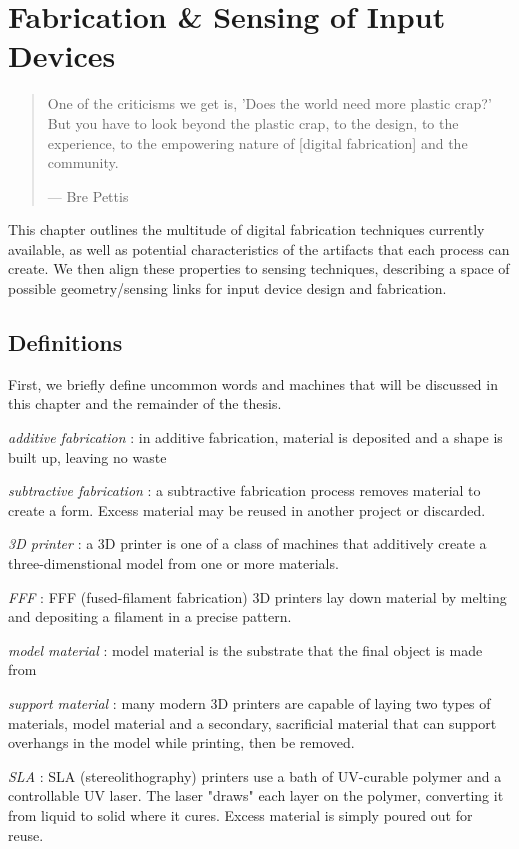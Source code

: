 \chapter{Fabrication \& Sensing of Input Devices}


\begin{quote}
One of the criticisms we get is, 'Does the world need more plastic crap?' But you have to look beyond the plastic crap, to the design, to the experience, to the empowering nature of [digital fabrication] and the community.

--- Bre Pettis
\end{quote}

This chapter outlines the multitude of digital fabrication techniques currently available, as well as potential characteristics of the artifacts that each process can create. We then align these properties to sensing techniques, describing a space of possible geometry/sensing links for input device design and fabrication.

\section{Definitions}

First, we briefly define uncommon words and machines that will be discussed in this chapter and the remainder of the thesis.

\emph{additive fabrication} : in additive fabrication, material is deposited and a shape is built up, leaving no waste

\emph{subtractive fabrication} : a subtractive fabrication process removes material to create a form. Excess material may be reused in another project or discarded.

\emph{3D printer} : a 3D printer is one of a class of machines that additively create a three-dimenstional model from one or more materials.

\emph{FFF} : FFF (fused-filament fabrication) 3D printers lay down material by melting and depositing a filament in a precise pattern.

\emph{model material} : model material is the substrate that the final object is made from

\emph{support material} : many modern 3D printers are capable of laying two types of materials, model material and a secondary, sacrificial material that can support overhangs in the model while printing, then be removed.

\emph{SLA} : SLA (stereolithography) printers use a bath of UV-curable polymer and a controllable UV laser. The laser "draws" each layer on the polymer, converting it from liquid to solid where it cures. Excess material is simply poured out for reuse.

